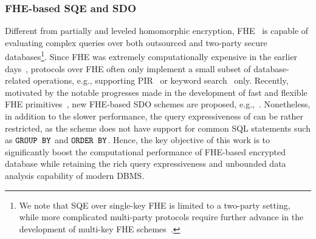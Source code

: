 \subsubsection{FHE-based SQE and SDO}
Different from partially and leveled homomorphic
encryption, FHE~\cite{DBLP:conf/crypto/brakerski12, DBLP:conf/innovations/bgv12, 
DBLP:journals/dcc/SmartV14, DBLP:conf/crypto/GentrySW13, DBLP:conf/eurocrypt/DucasM15,  
DBLP:journals/joc/ChillottiGGI20,  DBLP:conf/asiacrypt/CheonKKS17} 
is capable of evaluating complex queries over both outsourced and 
two-party secure databases\footnote{We note 
that SQE over single-key FHE is limited to a two-party setting, while more
complicated multi-party protocols require further advance in the
development of multi-key FHE schemes~\cite{peikert2016multi,mukherjee2016two,aloufi2021computing}.}.
Since FHE was extremely computationally expensive in the earlier 
days~\cite{cryptdb,shan2018practical},  protocols over FHE often only implement a
small subset of database-related operations, e.g., 
supporting PIR~\cite{yi2012single} or keyword search~\cite{khedr2015shield,oscc} only.
Recently, motivated by the notable progresses made in the development of
fast and flexible FHE primitives~\cite{pegasus, ckksbootvariance}, new FHE-based
SDO schemes are proposed, e.g.,~\cite{heda}. Nonetheless, in addition to the slower 
performance, 
the query expressiveness of \cite{heda} can be rather restricted,
as the scheme does not have support for common SQL statements such as
$\texttt{GROUP BY}$ and $\texttt{ORDER BY}$.
Hence, the key objective of this work is to significantly boost the 
computational performance of FHE-based encrypted database while retaining the
rich query expressiveness and unbounded data analysis capability of modern DBMS.







